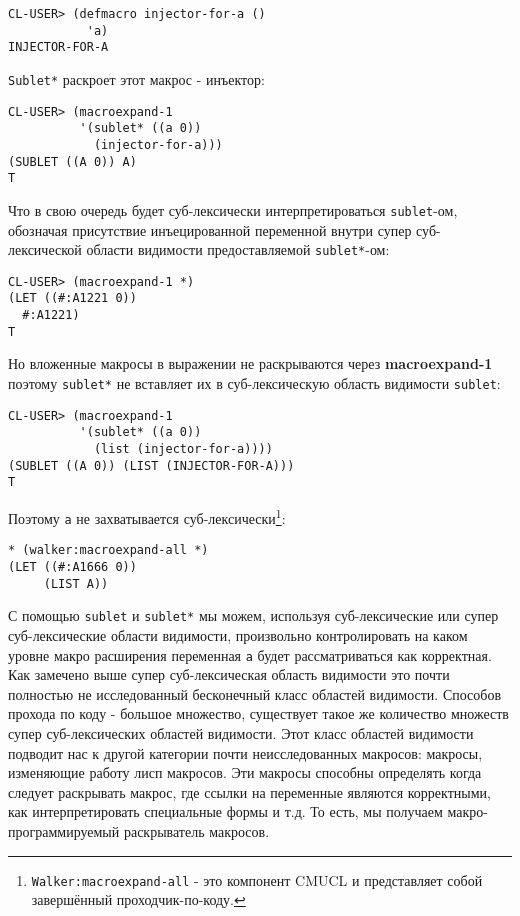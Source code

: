 \begin{verbatim}
CL-USER> (defmacro injector-for-a ()
           'a)
INJECTOR-FOR-A
\end{verbatim}

\verb"Sublet*" раскроет этот макрос - инъектор:

\begin{verbatim}
CL-USER> (macroexpand-1
          '(sublet* ((a 0))
            (injector-for-a)))
(SUBLET ((A 0)) A)
T
\end{verbatim}

Что в свою очередь будет суб-лексически интерпретироваться \verb"sublet"-ом, обозначая присутствие инъецированной переменной внутри супер суб-лексической области видимости предоставляемой \verb"sublet*"-ом:

\begin{verbatim}
CL-USER> (macroexpand-1 *)
(LET ((#:A1221 0))
  #:A1221)
T
\end{verbatim}

Но вложенные макросы в выражении не раскрываются через \textbf{mac\-ro\-ex\-pand-1} поэтому \verb"sublet*" не вставляет их в суб-лексическую область видимости \verb"sublet":

\begin{verbatim}
CL-USER> (macroexpand-1
          '(sublet* ((a 0))
            (list (injector-for-a))))
(SUBLET ((A 0)) (LIST (INJECTOR-FOR-A)))
T
\end{verbatim}

Поэтому \verb"a" не захватывается суб-лексически\footnote{\verb"Walker:macroexpand-all" - это компонент CMUCL и представляет собой завершённый проходчик-по-коду.}:



\begin{verbatim}
* (walker:macroexpand-all *)
(LET ((#:A1666 0))
     (LIST A))
\end{verbatim}

С помощью \verb"sublet" и \verb"sublet*" мы можем, используя суб-лексические или супер суб-лексические области видимости, произвольно контролировать на каком уровне макро расширения переменная \verb"a" будет рассматриваться как корректная. Как замечено выше супер суб-лексическая область видимости это почти полностью не исследованный бесконечный класс областей видимости. Способов прохода по коду - большое множество, существует такое же количество множеств супер суб-лексических областей видимости. Этот класс областей видимости подводит нас к другой категории почти неисследованных макросов: макросы, изменяющие работу лисп макросов. Эти макросы способны определять когда следует раскрывать макрос, где ссылки на переменные являются корректными, как интерпретировать специальные формы и т.д. То есть, мы получаем макро-программируемый раскрыватель макросов.

